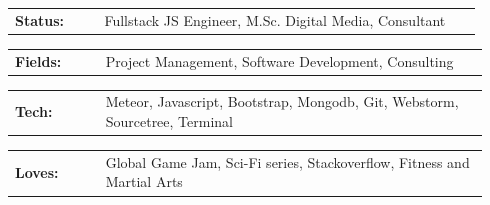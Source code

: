 \documentclass[10pt,A4]{article}
\newcommand{\tzlarrow}{(0,0) -- (0.2,0) -- (0.3,0.2) -- (0.2,0.4) -- (0,0.4) -- (0.1,0.2) -- cycle;}
\newcommand{\larrow}[1]
{\begin{tikzpicture}[scale=0.58]
	 \filldraw[fill=#1!100,draw=#1!100!black]  \tzlarrow
 \end{tikzpicture}
}
\newcommand{\metasection}[2]{
	\begin{tabular*}{1\linewidth}{p{0.18\linewidth} p{0.76\linewidth}}
		\larrow{bgcol}\normalsize{\textbf{\textcolor{sectcol}{#1}}}&#2\\
	\end{tabular*}
}
\newcommand{\spread}{7pt}
\begin{document}
\begin{minipage}[t]{0.485\textwidth}

\vspace{\spread}

\metasection{Status:}{Fullstack JS Engineer, M.Sc. Digital Media, Consultant}
\metasection{Fields:}{Project Management, Software Development, Consulting} 
\end{minipage}
\hfill
\begin{minipage}[t]{0.485\textwidth}

\vspace{5pt}

\metasection{Tech:}{Meteor, Javascript, Bootstrap, Mongodb, Git, Webstorm, Sourcetree, Terminal}
\metasection{Loves:}{Global Game Jam, Sci-Fi series, Stackoverflow, Fitness and Martial Arts}
\end{minipage}
\end{document}
